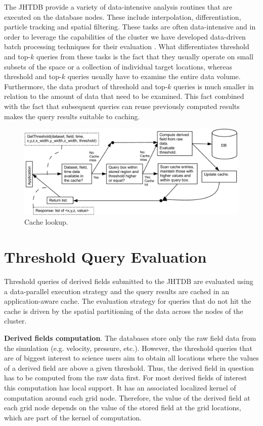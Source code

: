 \documentclass{sig-alternate}
\begin{document}
The JHTDB provide a variety of data-intensive analysis routines that are executed on the database nodes. These include interpolation, 
differentiation, particle tracking and spatial filtering. These tasks are often data-intensive and in order to leverage the capabilities of the cluster we
have developed data-driven batch processing techniques for their evaluation \cite{KanovSC11, KanovSC12}. What differentiates threshold and
top-$k$ queries from these tasks is the fact that they usually operate on small subsets of the space or a collection of individual target locations, whereas
threshold and top-$k$ queries usually have to examine the entire data volume. Furthermore, the data product of threshold and top-$k$ queries is much
smaller in relation to the amount of data that need to be examined. This fact combined with the fact that subsequent queries can reuse previously
computed results makes the query results suitable to caching. 

\begin{figure}
\centering
\includegraphics[width=6.5in]{Figures/cache_diagram.pdf}
\caption{Cache lookup.}
\label{fig:cache_diagram}
\end{figure}

\section{Threshold Query Evaluation}

Threshold queries of derived fields submitted to the JHTDB are evaluated using a data-parallel execution strategy and the query results are 
cached in an application-aware cache. The evaluation strategy for queries that do not hit the cache is driven by the spatial partitioning of the 
data across the nodes of the cluster.

{\bf Derived fields computation}. The databases store only the raw field data from the simulation (e.g. velocity, pressure, etc.). However, the threshold
queries that are of biggest interest to science users aim to obtain all locations where the values of a derived field are above a given threshold. Thus, the
derived field in question has to be computed from the raw data first. For most derived fields of interest this computation has local support. It has an 
associated localized kernel of computation around each grid node. Therefore, the value of the derived field at each grid node depends on the value of the
stored field at the grid locations, which are part of the kernel of computation. 
\end{document}
